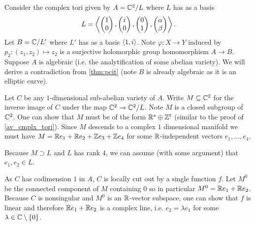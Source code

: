 \documentclass[11pt]{article}
\begin{document}
\begin{ex}
	Consider the complex tori given by $A = \mathbb{C}^2/L$ where $L$ has as a basis
	$$
	L = \left\langle
	\begin{pmatrix}1 \\ 0\end{pmatrix},
	\begin{pmatrix}i \\ 0\end{pmatrix},
	\begin{pmatrix}0 \\ 1\end{pmatrix},
	\begin{pmatrix}\alpha \\ \beta\end{pmatrix}\right\rangle.
	$$
	Let $B = \mathbb{C}/L'$ where $L'$ has as a basis $\left\langle1,i\right\rangle$. Note $\varphi:X \to Y$ induced by $p_2:(z_1,z_2) \mapsto z_2$ is a surjective holomorphic group homomorphism $A \to B$. Suppose $A$ is algebraic (i.e. the analytification of some abelian variety). We will derive a contradiction from \autoref{thm:pcit} (note $B$ is already algebraic as it is an elliptic curve).
	
	Let $C$ be any $1$-dimensional sub-abelian variety of $A$. Write $M\subseteq \mathbb{C}^2$ for the inverse image of $C$ under the map $\mathbb{C}^2 \to \mathbb{C}^2/L$. Note $M$ is a closed subgroup of $\mathbb{C}^2$. One can show that $M$ must be of the form $\mathbb{R}^s\oplus\mathbb{Z}^t$ (similar to the proof of \autoref{av_cmplx_tori}). Since $M$ descends to a complex $1$ dimensional manifold we must have $M = \mathbb{R} e_1 + \mathbb{R} e_2 + \mathbb{Z} e_3 + \mathbb{Z} e_4$ for some $\mathbb{R}$-independent vectors $e_1,\dots,e_4$.
	
	Because $M \supset L$ and $L$ has rank $4$, we can assume (with some argument) that $e_1,e_2\in L$.

	As $C$ has codimension $1$ in $A$, $C$ is locally cut out by a single function $f$. Let $M^0$ be the connected component of $M$ containing $0$ so in particular $M^0 = \mathbb{R} e_1 + \mathbb{R} e_2$. Because $C$ is nonsingular and $M^0$ is an $\mathbb{R}$-vector subspace, one can show that $f$ is linear and therefore $\mathbb{R} e_1 + \mathbb{R} e_2$ is a complex line, i.e. $e_2 = \lambda e_1$ for some $\lambda\in\mathbb{C}\setminus\{0\}$.
	

\end{ex}
\end{document}
